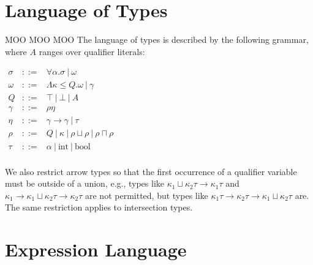 \documentclass{article}
\begin{document}
\section{Language of Types}
MOO MOO MOO
The language of types is described by the following grammar, where $A$ ranges over qualifier literals:

\begin{math}
\begin{array}{rcl}
\sigma & ::= & \forall \alpha . \sigma\ |\ \omega \\

\omega & ::= & \Lambda \kappa \le Q . \omega\ |\ \gamma \\

Q & ::= & \top\ |\ \bot\ |\ A \\

\gamma & ::= & \rho \eta \\

\eta & ::= & \gamma \rightarrow \gamma\ |\ \tau \\

\rho & ::= & Q\ |\ \kappa\ |\ \rho \sqcup \rho\ |\ \rho \sqcap \rho \\

\tau & ::= & \alpha\ |\ \textrm{int}\ |\ \textrm{bool} \\

\end{array}
\end{math}

We also restrict arrow types so that the first occurrence of a qualifier variable must be outside of a union, e.g., types like ${\kappa}_1 \sqcup {\kappa}_2 \tau \rightarrow {\kappa}_1 \tau$ and ${\kappa}_1 \rightarrow {\kappa}_1 \sqcup {\kappa}_2 \tau \rightarrow {\kappa}_2 \tau$ are not permitted, but types like ${\kappa}_1 \tau \rightarrow {\kappa}_2 \tau \rightarrow {\kappa}_1 \sqcup {\kappa}_2 \tau$ are.
  The same restriction applies to intersection types.


\section{Expression Language}
\end{document}
